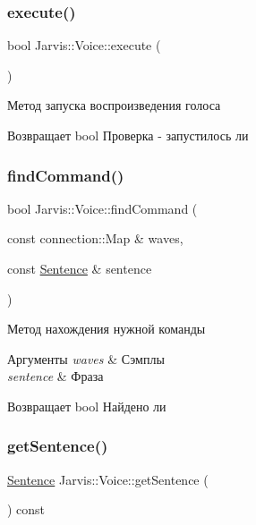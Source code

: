 \subsubsection{\texorpdfstring{execute()}{execute()}}
{\footnotesize\ttfamily bool Jarvis\+::\+Voice\+::execute (\begin{DoxyParamCaption}{ }\end{DoxyParamCaption})}



Метод запуска воспроизведения голоса 

\begin{DoxyReturn}{Возвращает}
bool Проверка -\/ запустилось ли 
\end{DoxyReturn}
\mbox{\label{classJarvis_1_1Voice_a509a6161183e0f2f8053371e621379ea}} 
\subsubsection{\texorpdfstring{find\+Command()}{findCommand()}}
{\footnotesize\ttfamily bool Jarvis\+::\+Voice\+::find\+Command (\begin{DoxyParamCaption}\item[{const connection\+::\+Map \&}]{waves,  }\item[{const \hyperlink{classJarvis_1_1Sentence}{Sentence} \&}]{sentence }\end{DoxyParamCaption})}



Метод нахождения нужной команды 


\begin{DoxyParams}{Аргументы}
{\em waves} & Сэмплы \\
\hline
{\em sentence} & Фраза \\
\hline
\end{DoxyParams}
\begin{DoxyReturn}{Возвращает}
bool Найдено ли 
\end{DoxyReturn}
\mbox{\label{classJarvis_1_1Voice_ad1f37700f0f76426d34ba31a342505e8}} 
\subsubsection{\texorpdfstring{get\+Sentence()}{getSentence()}}
{\footnotesize\ttfamily \hyperlink{classJarvis_1_1Sentence}{Sentence} Jarvis\+::\+Voice\+::get\+Sentence (\begin{DoxyParamCaption}{ }\end{DoxyParamCaption}) const}



